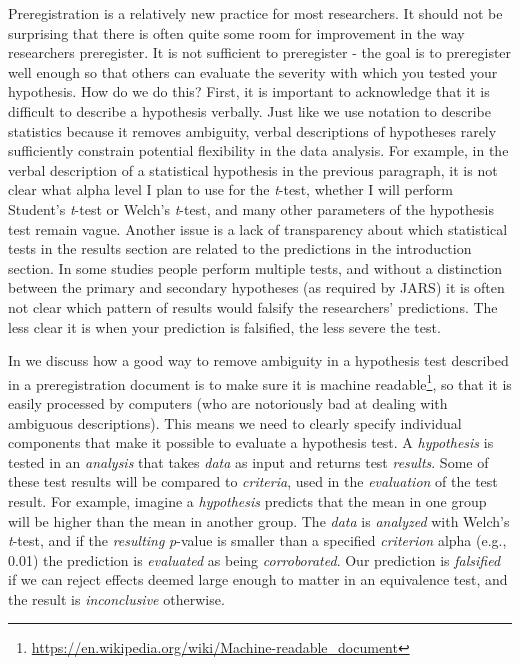 \documentclass[
  oneside]{krantz}
\renewcommand{\href}[2]{#2\footnote{\url{#1}}}
\begin{document}
Preregistration is a relatively new practice for most researchers. It should not be surprising that there is often quite some room for improvement in the way researchers preregister. It is not sufficient to preregister - the goal is to preregister well enough so that others can evaluate the severity with which you tested your hypothesis. How do we do this? First, it is important to acknowledge that it is difficult to describe a hypothesis verbally. Just like we use notation to describe statistics because it removes ambiguity, verbal descriptions of hypotheses rarely sufficiently constrain potential flexibility in the data analysis. For example, in the verbal description of a statistical hypothesis in the previous paragraph, it is not clear what alpha level I plan to use for the \emph{t}-test, whether I will perform Student's \emph{t}-test or Welch's \emph{t}-test, and many other parameters of the hypothesis test remain vague. Another issue is a lack of transparency about which statistical tests in the results section are related to the predictions in the introduction section. In some studies people perform multiple tests, and without a distinction between the primary and secondary hypotheses (as required by JARS) it is often not clear which pattern of results would falsify the researchers' predictions. The less clear it is when your prediction is falsified, the less severe the test.

In \citet{lakens_improving_2020} we discuss how a good way to remove ambiguity in a hypothesis test described in a preregistration document is to make sure it is \href{https://en.wikipedia.org/wiki/Machine-readable_document}{machine readable}, so that it is easily processed by computers (who are notoriously bad at dealing with ambiguous descriptions). This means we need to clearly specify individual components that make it possible to evaluate a hypothesis test. A \emph{hypothesis} is tested in an \emph{analysis} that takes \emph{data} as input and returns test \emph{results}. Some of these test results will be compared to \emph{criteria}, used in the \emph{evaluation} of the test result. For example, imagine a \emph{hypothesis} predicts that the mean in one group will be higher than the mean in another group. The \emph{data} is \emph{analyzed} with Welch's \emph{t}-test, and if the \emph{resulting} \emph{p}-value is smaller than a specified \emph{criterion} alpha (e.g., 0.01) the prediction is \emph{evaluated} as being \emph{corroborated}. Our prediction is \emph{falsified} if we can reject effects deemed large enough to matter in an equivalence test, and the result is \emph{inconclusive} otherwise.
\end{document}
